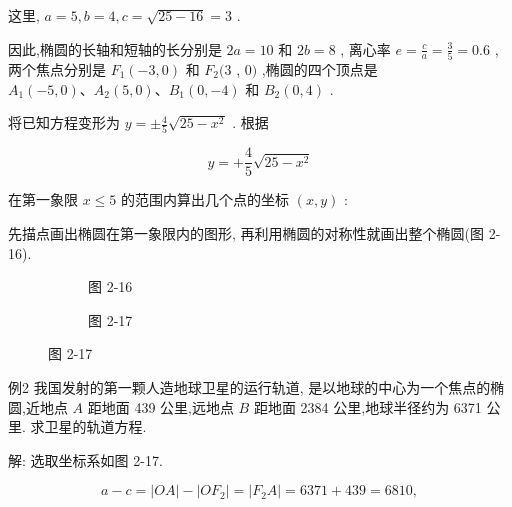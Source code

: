 \documentclass[lang=cn,newtx,12pt,scheme=chinese]{elegantbook}
\begin{document}
这里, \(a = 5,b = 4,c = \sqrt{{25} - {16}} = 3\) .

因此,椭圆的长轴和短轴的长分别是 \({2a} = {10}\) 和 \({2b} = 8\) , 离心率 \(e = \frac{c}{a} = \frac{3}{5} = {0.6}\) ,两个焦点分别是 \({F}_{1}\left( {-3,0}\right)\) 和 \({F}_{2}(3\) , \(0)\) ,椭圆的四个顶点是 \({A}_{1}\left( {-5,0}\right) \text{、}{A}_{2}\left( {5,0}\right) \text{、}{B}_{1}\left( {0, - 4}\right)\) 和 \({B}_{2}\left( {0,4}\right)\) .

将已知方程变形为 \(y = \pm \frac{4}{5}\sqrt{{25} - {x}^{2}}\) . 根据

\[
  y = + \frac{4}{5}\sqrt{{25} - {x}^{2}}
\]

在第一象限 \(x \leq 5\) 的范围内算出几个点的坐标 \(\left( {x,y}\right)\) :

\begin{center}
\end{center}

先描点画出椭圆在第一象限内的图形, 再利用椭圆的对称性就画出整个椭圆(图 2-16).

\begin{figure}[h]
	\centering
	\begin{subfigure}[h]{0.45\textwidth}
		\centering
		
		\caption{图 2-16}
	\end{subfigure}
	\hfill %
	\begin{subfigure}[h]{0.45\textwidth}
		\centering
		
		\caption{图 2-17}
	\end{subfigure}
\end{figure}

例2 我国发射的第一颗人造地球卫星的运行轨道, 是以地球的中心为一个焦点的椭圆,近地点 \(A\) 距地面 439 公里,远地点 \(B\) 距地面 2384 公里,地球半径约为 6371 公里. 求卫星的轨道方程.

解: 选取坐标系如图 2-17.

\[
  a - c = \left| {OA}\right| - \left| {O{F}_{2}}\right| = \left| {{F}_{2}A}\right| = {6371} + {439} = {6810},
\]
\end{document}
